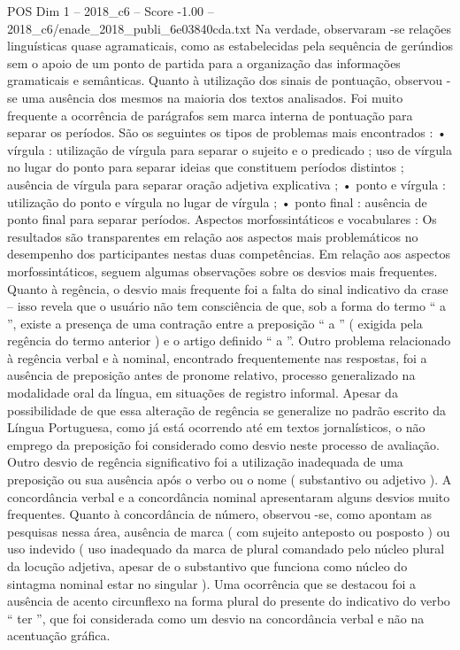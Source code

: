 \begin{textsample}{POS Dim 1 – 2018\_c6 – Score -1.00 – 2018\_c6/enade\_2018\_publi\_6e03840cda.txt}
Na verdade, observaram -se relações linguísticas quase agramaticais, como as estabelecidas pela sequência de gerúndios sem o apoio de um ponto de partida para a organização das informações gramaticais e semânticas.
Quanto à utilização dos sinais de pontuação, observou -se uma ausência dos mesmos na maioria dos textos analisados.
Foi muito frequente a ocorrência de parágrafos sem marca interna de pontuação para separar os períodos.
São os seguintes os tipos de problemas mais encontrados : • vírgula : utilização de vírgula para separar o sujeito e o predicado ; uso de vírgula no lugar do ponto para separar ideias que constituem períodos distintos ; ausência de vírgula para separar oração adjetiva explicativa ; • ponto e vírgula : utilização do ponto e vírgula no lugar de vírgula ; • ponto final : ausência de ponto final para separar períodos.
Aspectos morfossintáticos e vocabulares : Os resultados são transparentes em relação aos aspectos mais problemáticos no desempenho dos participantes nestas duas competências.
Em relação aos aspectos morfossintáticos, seguem algumas observações sobre os desvios mais frequentes.
Quanto à regência, o desvio mais frequente foi a falta do sinal indicativo da crase – isso revela que o usuário não tem consciência de que, sob a forma do termo “ a ”, existe a presença de uma contração entre a preposição “ a ” ( exigida pela regência do termo anterior ) e o artigo definido “ a ”.
Outro problema relacionado à regência verbal e à nominal, encontrado frequentemente nas respostas, foi a ausência de preposição antes de pronome relativo, processo generalizado na modalidade oral da língua, em situações de registro informal.
Apesar da possibilidade de que essa alteração de regência se generalize no padrão escrito da Língua Portuguesa, como já está ocorrendo até em textos jornalísticos, o não emprego da preposição foi considerado como desvio neste processo de avaliação.
Outro desvio de regência significativo foi a utilização inadequada de uma preposição ou sua ausência após o verbo ou o nome ( substantivo ou adjetivo ).
A concordância verbal e a concordância nominal apresentaram alguns desvios muito frequentes.
Quanto à concordância de número, observou -se, como apontam as pesquisas nessa área, ausência de marca ( com sujeito anteposto ou posposto ) ou uso indevido ( uso inadequado da marca de plural comandado pelo núcleo plural da locução adjetiva, apesar de o substantivo que funciona como núcleo do sintagma nominal estar no singular ).
Uma ocorrência que se destacou foi a ausência de acento circunflexo na forma plural do presente do indicativo do verbo “ ter ”, que foi considerada como um desvio na concordância verbal e não na acentuação gráfica.

\end{textsample}
